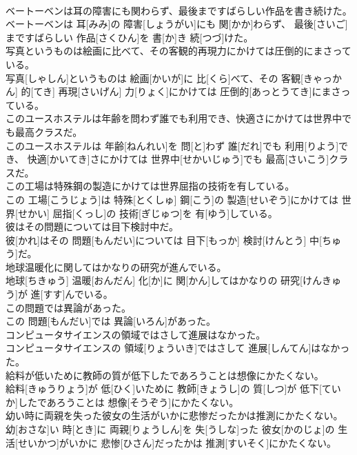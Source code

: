 \documentclass[8pt]{extreport}
\begin{document}
\begin{CJK}{UTF8}{min}
\\	ベートーベンは耳の障害にも関わらず、最後まですばらしい作品を書き続けた。	
\\	ベートーベンは 耳[みみ]の 障害[しょうがい]にも 関[かか]わらず、 最後[さいご]まですばらしい 作品[さくひん]を 書[か]き 続[つづ]けた。
\\	写真というものは絵画に比べて、その客観的再現力にかけては圧倒的にまさっている。	
\\	写真[しゃしん]というものは 絵画[かいが]に 比[くら]べて、その 客観[きゃっかん] 的[てき] 再現[さいげん] 力[りょく]にかけては 圧倒的[あっとうてき]にまさっている。
\\	このユースホステルは年齢を問わず誰でも利用でき、快適さにかけては世界中でも最高クラスだ。	
\\	このユースホステルは 年齢[ねんれい]を 問[と]わず 誰[だれ]でも 利用[りよう]でき、 快適[かいてき]さにかけては 世界中[せかいじゅう]でも 最高[さいこう]クラスだ。
\\	この工場は特殊鋼の製造にかけては世界屈指の技術を有している。	
\\	この 工場[こうじょう]は 特殊[とくしゅ] 鋼[こう]の 製造[せいぞう]にかけては 世界[せかい] 屈指[くっし]の 技術[ぎじゅつ]を 有[ゆう]している。
\\	彼はその問題については目下検討中だ。	
\\	彼[かれ]はその 問題[もんだい]については 目下[もっか] 検討[けんとう] 中[ちゅう]だ。
\\	地球温暖化に関してはかなりの研究が進んでいる。	
\\	地球[ちきゅう] 温暖[おんだん] 化[か]に 関[かん]してはかなりの 研究[けんきゅう]が 進[すす]んでいる。
\\	この問題では異論があった。	
\\	この 問題[もんだい]では 異論[いろん]があった。
\\	コンピュータサイエンスの領域ではさして進展はなかった。	
\\	コンピュータサイエンスの 領域[りょういき]ではさして 進展[しんてん]はなかった。
\\	給料が低いために教師の質が低下したであろうことは想像にかたくない。	
\\	給料[きゅうりょう]が 低[ひく]いために 教師[きょうし]の 質[しつ]が 低下[ていか]したであろうことは 想像[そうぞう]にかたくない。
\\	幼い時に両親を失った彼女の生活がいかに悲惨だったかは推測にかたくない。	
\\	幼[おさな]い 時[とき]に 両親[りょうしん]を 失[うしな]った 彼女[かのじょ]の 生活[せいかつ]がいかに 悲惨[ひさん]だったかは 推測[すいそく]にかたくない。

\end{CJK}
\end{document}
